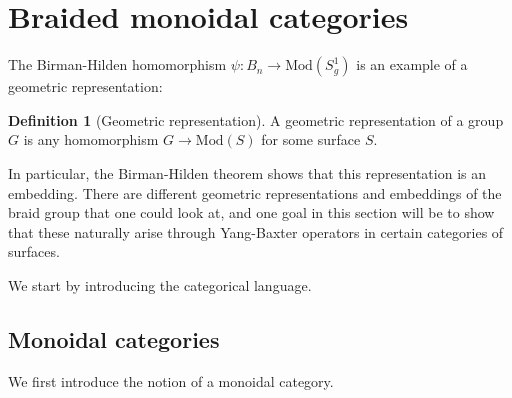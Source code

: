 \documentclass[reqno]{amsart}
\theoremstyle{definition}
\newtheorem{definition}[theorem]{Definition}
\theoremstyle{remark}
\newcommand{\Mod}{{\mathrm{Mod}}}
\begin{document}
   \newpage


   \section{Braided monoidal categories}

   The Birman-Hilden homomorphism
   $\psi \colon B_n \to \Mod \left( S_g^{1} \right) $
   is an example of a geometric
   representation:

\begin{definition}[Geometric representation]
    A geometric representation of a group $G$ is any
    homomorphism $G \to \Mod (S)$ for some
    surface $S$.
\end{definition}
In particular, the Birman-Hilden theorem shows that this
representation is an embedding. There are different
geometric representations and embeddings of the braid
group that one could look at, and one goal in this section will be
to show that these naturally arise through Yang-Baxter operators
in certain categories of surfaces. 

We start by introducing the categorical language.

   \subsection{Monoidal categories}

   We first introduce the notion of a monoidal category.
\end{document}

